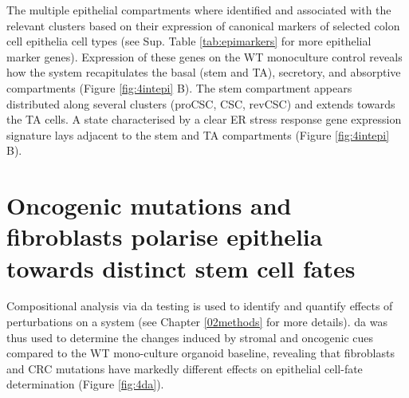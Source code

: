The multiple epithelial compartments where identified and associated with the relevant clusters based on their expression of canonical markers of selected colon cell epithelia cell types (see Sup. Table \ref{tab:epimarkers} for more epithelial marker genes). Expression of these genes on the WT monoculture control reveals how the system recapitulates the basal (stem and TA), secretory, and absorptive compartments (Figure \ref{fig:4intepi} B). The stem compartment appears distributed along several clusters (proCSC, CSC, revCSC) and extends towards the TA cells. A state characterised by a clear ER stress response gene expression signature lays adjacent to the stem and TA compartments (Figure \ref{fig:4intepi} B).


\section{Oncogenic mutations and fibroblasts polarise epithelia towards distinct stem cell fates}

Compositional analysis via \acrfull{da} testing \cite{dann_differential_2022} is used to identify and quantify effects of perturbations on a system (see Chapter \ref{02methods} for more details). \acrshort{da} was thus used to determine the changes induced by stromal and oncogenic cues compared to the WT mono-culture organoid baseline, revealing that fibroblasts and CRC mutations have markedly different effects on epithelial cell-fate determination (Figure \ref{fig:4da}). 

